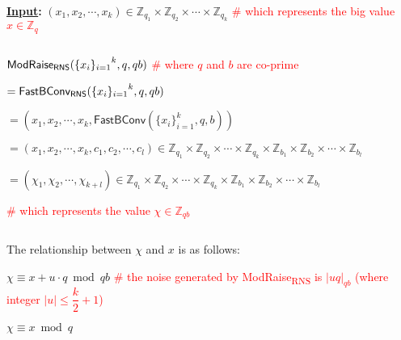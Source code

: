  \begin{tcolorbox}[title={\textbf{\tboxlabel{\ref*{subsec:rns-modraise}} \textsf{ModRaise\textsubscript{RNS}}}}]

\textbf{\underline{Input}:} $(x_1, x_2, \cdots, x_k) \in \mathbb{Z}_{q_1} \times \mathbb{Z}_{q_2} \times \cdots \times \mathbb{Z}_{q_k}$ \textcolor{red}{ \# which represents the big value $x \in \mathbb{Z}_q$}

$ $


$\textsf{ModRaise\textsubscript{RNS}}({\{x_i\}_{i=1}}^k, q, qb)$ \textcolor{red}{ \# where $q$ and $b$ are co-prime}

$= \textsf{FastBConv\textsubscript{RNS}}({\{x_i\}_{i=1}}^k, q, qb)$ 

$ = (x_1, x_2, \cdots, x_k, \textsf{FastBConv}(\{x_i\}_{i=1}^k, q, b))$ 

$ = (x_1, x_2, \cdots, x_k, c_1, c_2, \cdots, c_l) \in \mathbb{Z}_{q_1} \times \mathbb{Z}_{q_2} \times \cdots \times \mathbb{Z}_{q_k} \times \mathbb{Z}_{b_1} \times \mathbb{Z}_{b_2} \times \cdots \times \mathbb{Z}_{b_l}$

$ = (\chi_1, \chi_2, \cdots, \chi_{k+l}) \in \mathbb{Z}_{q_1} \times \mathbb{Z}_{q_2} \times \cdots \times \mathbb{Z}_{q_k} \times \mathbb{Z}_{b_1} \times \mathbb{Z}_{b_2} \times \cdots \times \mathbb{Z}_{b_l}$

\textcolor{red}{ \# which represents the value $\chi \in \mathbb{Z}_{qb}$}

$ $


The relationship between $\chi$ and $x$ is as follows: 

$\chi \equiv x + u\cdot q \bmod qb$ \textcolor{red}{ \# the noise generated by \textsf{ModRaise\textsubscript{RNS}} is $|uq|_{qb}$ (where integer $|u| \leq \dfrac{k}{2}+1$)}

$\chi \equiv x \bmod q$

\end{tcolorbox}


